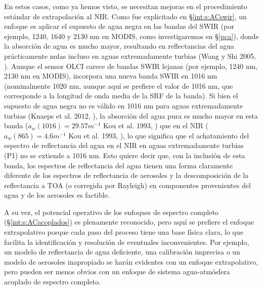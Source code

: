     En estos casos, como ya hemos visto, se necesitan mejoras en el procedimiento estándar de extrapolación al NIR. Como fue explicitado en \S \ref{int:s:ACswir}, un enfoque es aplicar el supuesto de agua negra en las bandas del SWIR (por ejemplo, 1240, 1640 y 2130 nm en MODIS, como investigaremos en \S \ref{pca}), donde la absorción de agua es mucho mayor,  resultando en reflectancias del agua prácticamente nulas incluso en aguas extremadamente turbias (Wang y Shi 2005, \cite{wang2005}). Aunque el sensor OLCI carece de bandas SWIR lejanas (por ejemplo, 1240 nm, 2130 nm en MODIS), incorpora una nueva banda SWIR en 1016 nm (nominalmente 1020 nm, aunque aquí se prefiere el valor de 1016 nm, que corresponde a la longitud de onda media de la SRF de la banda). Si bien el supuesto de agua negra no es válido en 1016 nm para aguas extremadamente turbias (Knaeps et al. 2012, \cite{knaeps2012}), la absorción del agua pura es mucho mayor en esta banda ($a_{w}(1016)=29.57 m^{-1}$ Kou et al. 1993, \cite{kou1993}) que en el NIR ($a_{w}(865)=4.6 m^{-1}$ Kou et al. 1993, \cite{kou1993}), lo que significa que el achatamiento del espectro de reflectancia del agua en el NIR en aguas extremadamente turbias (P1) no se extiende a 1016 nm. Esto quiere decir que, con la inclusión de esta banda, los espectros de reflectancia del agua tienen una forma claramente diferente de los espectros de reflectancia de aerosoles y la descomposición de la reflectancia a TOA (o corregida por Rayleigh) en componentes provenientes del agua y de los aerosoles es factible. 
    
    A su vez, el potencial operativo de los enfoques de espectro completo (\S \ref{int:s:ACacoplados}) es plenamente reconocido, pero aquí se prefiere el enfoque extrapolativo porque cada paso del proceso tiene una base física clara, lo que facilita la identificación y resolución de eventuales inconvenientes. Por ejemplo, un modelo de reflectancia de agua deficiente, una calibración imprecisa o un modelo de aerosoles inapropiado se harán evidentes con un enfoque extrapolativo, pero pueden ser menos obvios con un enfoque de sistema agua-atmósfera acoplado de espectro completo.
    
